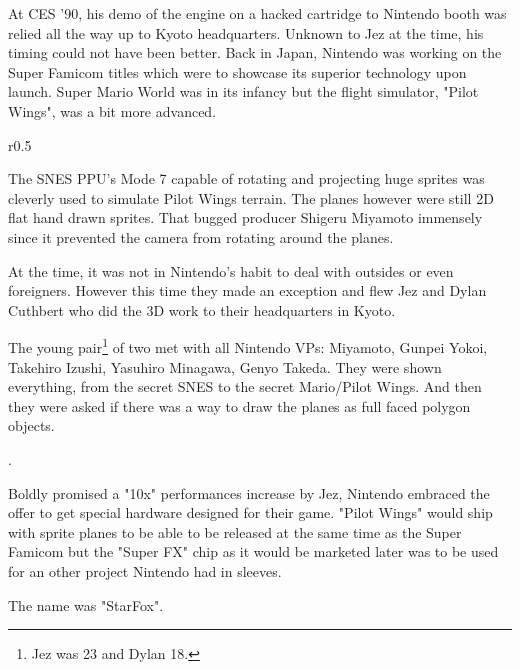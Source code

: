 At CES '90, his demo of the engine on a hacked cartridge to Nintendo booth was relied all the way up to Kyoto headquarters. Unknown to Jez at the time, his timing could not have been better. Back in Japan, Nintendo was working on the Super Famicom titles which were to showcase its superior technology upon launch. Super Mario World was in its infancy but the flight simulator, "Pilot Wings", was a bit more advanced.\\ 
\par
\begin{wrapfigure}[14]{r}{0.5\textwidth}{
\centering {}}
\end{wrapfigure}
The SNES PPU's Mode 7 capable of rotating and projecting huge sprites was cleverly used to simulate Pilot Wings terrain. The planes however were still 2D flat hand drawn sprites. That bugged producer Shigeru Miyamoto immensely since it prevented the camera from rotating around the planes.\\
\par
At the time, it was not in Nintendo's habit to deal with outsides or even foreigners. However this time they made an exception and flew Jez and Dylan Cuthbert who did the 3D work to their headquarters in Kyoto.\\
\par
 The young pair\footnote{Jez was 23 and Dylan 18.} of two met with all Nintendo VPs: Miyamoto, Gunpei Yokoi, Takehiro Izushi, Yasuhiro Minagawa, Genyo Takeda. They were shown everything, from the secret SNES to the secret Mario/Pilot Wings. And then they were asked if there was a way to draw the planes as full faced polygon objects.\\
\par
{}.\\
\par

Boldly promised a "10x" performances increase by Jez, Nintendo embraced the offer to get special hardware designed for their game. "Pilot Wings" would ship with sprite planes to be able to be released at the same time as the Super Famicom but the "Super FX" chip as it would be marketed later was to be used for an other project Nintendo had in sleeves.\\
\par
The name was "StarFox".

